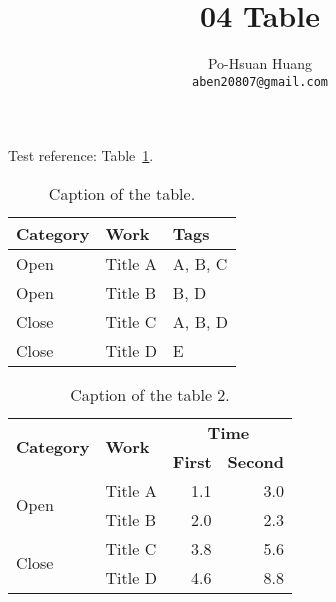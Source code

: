 \documentclass[12pt, a4paper]{article}
\title{04 Table}
\author{Po-Hsuan Huang\\ 
    \texttt{aben20807@gmail.com}
}
\begin{document}
\vspace*{-50pt}
    {\let\newpage\relax\maketitle}

Test reference: Table~\ref{tab:example}.

\begin{table}[ht]
    \centering
    \caption{Caption of the table.}\label{tab:example}
    \begin{tabular}{lll}
    \toprule
    \textbf{Category} & \textbf{Work} & \textbf{Tags} \\
    \midrule
        Open     &   Title A   &   A, B, C   \\
        Open     &   Title B   &  B, D    \\
        Close     &   Title C   &  A, B, D    \\
        Close     &   Title D   &  E   \\
    \bottomrule
    \end{tabular}
\end{table}

\begin{table}[ht]
    \centering
    \caption{Caption of the table 2.}\label{tab:example2}
    \begin{tabular}{llrr}
    \toprule
    \multirow{2}{*}{\textbf{Category}} & \multirow{2}{*}{\textbf{Work}} & \multicolumn{2}{c}{\textbf{Time}} \\ \cline{3-4} 
                              &                       & \textbf{First}      & \textbf{Second}      \\ \hline
    \multirow{2}{*}{Open}         &  Title A                     &    1.1        &    3.0       \\
                                                        &  Title B                     &    2.0       &    2.3       \\ \hline
    \multirow{2}{*}{Close}         &  Title C                     &   3.8        &    5.6       \\
                                                        &   Title D                    &   4.6        &    8.8       \\ \bottomrule
    \end{tabular}
\end{table}
\end{document}

